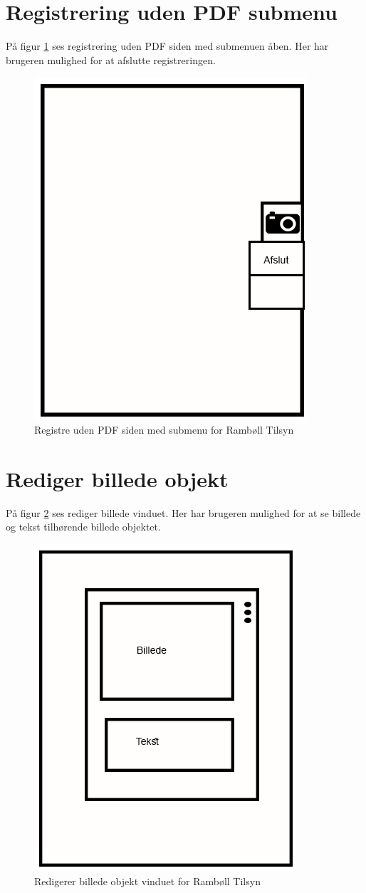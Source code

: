 \section{Registrering uden PDF submenu}\label{sec:RegUdenPDFSubMock}
På figur \ref{fig:RegUdenPDFSubMock} ses registrering uden PDF siden med submenuen åben. Her har brugeren mulighed for at afslutte registreringen.

\begin{figure}[H]
	\centering
	\includegraphics[width=0.4\linewidth]{MockUps/Mock/Ramboell-TilsynUden-sub}
	\caption{Registre uden PDF siden med submenu for Rambøll Tilsyn}
	\label{fig:RegUdenPDFSubMock}
\end{figure}

\clearpage

\section{Rediger billede objekt}\label{sec:RedigerBilledeMock}
På figur \ref{fig:RedigerBilledeMock} ses rediger billede vinduet. Her har brugeren mulighed for at se  billede og tekst tilhørende billede objektet.

\begin{figure}[H]
	\centering
	\includegraphics[width=0.4\linewidth]{MockUps/Mock/Ramboell-RedigerBilledeOpbjekt}
	\caption{Redigerer billede objekt vinduet for Rambøll Tilsyn}
	\label{fig:RedigerBilledeMock}
\end{figure}


